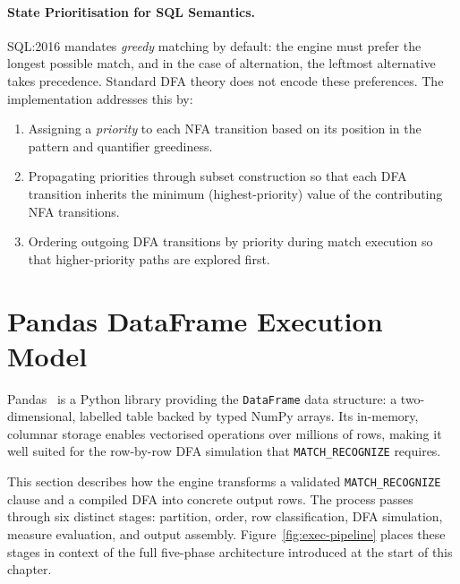 \paragraph{State Prioritisation for SQL Semantics.}
SQL:2016 mandates \emph{greedy} matching by default: the engine
must prefer the longest possible match, and in the case of
alternation, the leftmost alternative takes precedence.  Standard
DFA theory does not encode these preferences.  The implementation
addresses this by:
\begin{enumerate}
  \item Assigning a \emph{priority} to each NFA transition based on
    its position in the pattern and quantifier greediness.
  \item Propagating priorities through subset construction so that
    each DFA transition inherits the minimum (highest-priority)
    value of the contributing NFA transitions.
  \item Ordering outgoing DFA transitions by priority during
    match execution so that higher-priority paths are explored
    first.
\end{enumerate}


\section{Pandas DataFrame Execution Model}
\label{sec:meth-pandas}

Pandas~\cite{McKinney2010} is a Python library providing the
\texttt{DataFrame} data structure: a two-dimensional, labelled
table backed by typed NumPy arrays.  Its in-memory, columnar
storage enables vectorised operations over millions of rows, making
it well suited for the row-by-row DFA simulation that
\texttt{MATCH\_RECOGNIZE} requires.

This section describes how the engine transforms a validated
\texttt{MATCH\_RECOGNIZE} clause and a compiled DFA into concrete
output rows.  The process passes through six distinct stages:
partition, order, row classification, DFA simulation,
measure evaluation, and output assembly.
Figure~\ref{fig:exec-pipeline} places these stages in context
of the full five-phase architecture introduced at the start of
this chapter.

